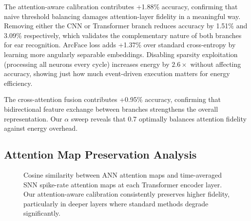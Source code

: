 \documentclass[11pt,a4paper]{article}
\begin{document}
The attention-aware calibration contributes +1.88\% accuracy, confirming that naive threshold balancing damages attention-layer fidelity in a meaningful way. Removing either the CNN or Transformer branch reduces accuracy by 1.51\% and 3.09\% respectively, which validates the complementary nature of both branches for ear recognition. ArcFace loss adds +1.37\% over standard cross-entropy by learning more angularly separable embeddings. Disabling sparsity exploitation (processing all neurons every cycle) increases energy by $2.6\times$ without affecting accuracy, showing just how much event-driven execution matters for energy efficiency.

The cross-attention fusion contributes +0.95\% accuracy, confirming that bidirectional feature exchange between branches strengthens the overall representation. Our $\alpha$ sweep reveals that 0.7 optimally balances attention fidelity against energy overhead.

\subsection{Attention Map Preservation Analysis}

\begin{figure}[!t]
\centering
{}
\caption{Cosine similarity between ANN attention maps and time-averaged SNN spike-rate attention maps at each Transformer encoder layer. Our attention-aware calibration consistently preserves higher fidelity, particularly in deeper layers where standard methods degrade significantly.}
\label{fig:attention_preservation}
\end{figure}
\end{document}
